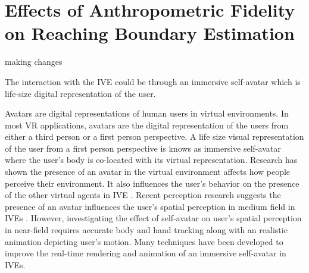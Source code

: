
\chapter{Effects of Anthropometric Fidelity on Reaching Boundary Estimation}
making changes

The interaction with the IVE could be through an immersive self-avatar which is life-size digital representation of the user. 

Avatars are digital representations of human users in virtual environments. In most VR applications, avatars are the digital representation of the users from either a third person or a first person perspective. A life size visual representation of the user from a first person perspective is knows as immersive self-avatar where the user's body is co-located with its virtual representation. Research has shown the presence of an avatar in the virtual environment affects how people perceive their environment. It also influences the user's behavior on the presence of the other virtual agents in IVE \cite{HUH10,SAD+06,ZUG+07}. Recent perception research suggests the presence of an avatar influences the user's spatial perception in medium field in IVEs \cite{MCW+10,LNW+03,WJS+08}. However, investigating the effect of self-avatar on user's spatial perception in near-field requires accurate body and hand tracking along with an realistic animation depicting user's motion. Many techniques have been developed to improve the real-time rendering and animation of an immersive self-avatar in IVEs. 






